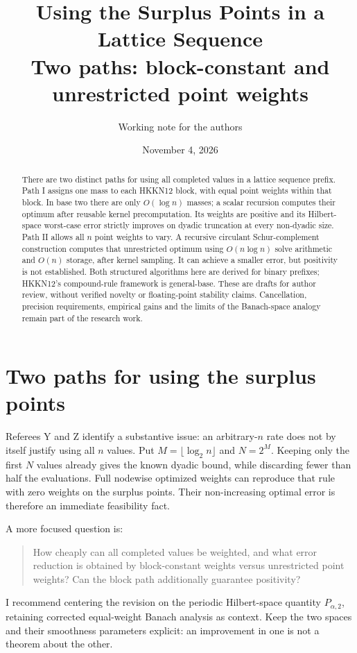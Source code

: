 \documentclass[11pt]{article}
\title{Using the Surplus Points in a Lattice Sequence\\
\large Two paths: block-constant and unrestricted point weights}
\author{Working note for the authors}
\date{November 4, 2026}
\begin{document}
\maketitle
\begin{abstract}
There are two distinct paths for using all completed values in a lattice
sequence prefix. Path I assigns one mass to each HKKN12 block, with
equal point weights within that block. In base two there are only
$O(\log n)$ masses; a scalar recursion computes their optimum after
reusable kernel precomputation. Its weights are positive and its
Hilbert-space worst-case error strictly improves on dyadic truncation
at every non-dyadic size. Path II allows all $n$ point weights to vary.
A recursive circulant Schur-complement construction computes that
unrestricted optimum using $O(n\log n)$ solve arithmetic and $O(n)$
storage, after kernel sampling. It can achieve a smaller error, but
positivity is not established. Both structured algorithms here are
derived for binary prefixes; HKKN12's compound-rule framework is
general-base. These are drafts for author review, without verified
novelty or floating-point stability claims. Cancellation, precision
requirements, empirical gains and the limits of the Banach-space
analogy remain part of the research work.
\end{abstract}

\section{Two paths for using the surplus points}\label{sec:paths}
Referees Y and Z identify a substantive issue: an arbitrary-$n$ rate
does not by itself justify using all $n$ values.
Put $M=\lfloor\log_2n\rfloor$ and $N=2^M$.
Keeping only the first $N$ values already gives the known dyadic bound,
while discarding fewer than half the evaluations.
Full nodewise optimized weights can reproduce that rule with zero
weights on the surplus points. Their non-increasing optimal error is
therefore an immediate feasibility fact.

A more focused question is:
\begin{quote}
How cheaply can all completed values be weighted, and what error
reduction is obtained by block-constant weights versus unrestricted
point weights? Can the block path additionally guarantee positivity?
\end{quote}
I recommend centering the revision on the periodic Hilbert-space
quantity $P_{\alpha,2}$, retaining corrected equal-weight Banach analysis
as context. Keep the two spaces and their smoothness parameters explicit:
an improvement in one is not a theorem about the other.
\end{document}
